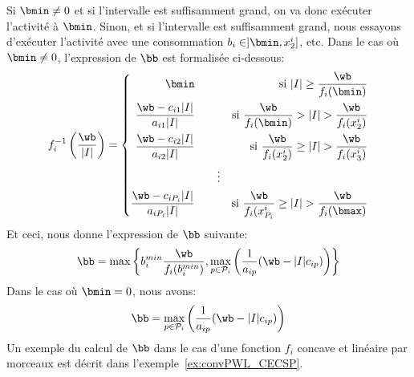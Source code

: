 Si $\bmin\neq 0$ et si l'intervalle est suffisamment grand, on va donc
exécuter l'activité à $\bmin$. Sinon, et si l'intervalle est
suffisamment grand, nous essayons d'exécuter l'activité avec une
consommation $b_i \in ]\bmin,x_2^i]$, etc. Dans le cas où $\bmin \neq
0$, l'expression de $\bb$ est formalisée ci-dessous:
\[f_i^{-1}\left(\frac{\wb}{|I|}\right)=\left\{
    \begin{aligned}
      \bmin & \qquad & \text{si } |I| \ge \frac{\wb}{f_i(\bmin)}\\
      \frac{\wb -c_{i1}|I|}{a_{i1}|I|} & \qquad & \text{si } \frac{\wb}{f_i(\bmin)}
      > |I| > \frac{\wb}{f_i(x^i_2)} \\
      \frac{\wb -c_{i2}|I|}{a_{i2}|I|} & \qquad & \text{si }  \frac{\wb}{f_i(x^i_2)}
      \ge |I| > \frac{\wb}{f_i(x^i_3)}\\
      & \qquad \vdots& \\
      \frac{\wb -c_{iP_i}|I|}{a_{iP_i}|I|} & \qquad & \text{si }  \frac{\wb}{f_i(x^i_{P_i}}
      \ge |I| > \frac{\wb}{f_i(\bmax)}\end{aligned}
  \right.
\]
Et ceci, nous donne l'expression de $\bb$ suivante:
\begin{equation}
  \bb= 
  \max \left\{b_i^{min} \frac{\wb}{f_i(b_i^{min})},
    \max_{ p \in \P_i} \left(\frac{1}{a_{ip}}(\wb-|I|c_{ip})\right)\right\}
\end{equation}
Dans le cas où $\bmin=0$, nous avons: 
\[
  \bb= 
  \max_{ p \in \P_i} \left(\frac{1}{a_{ip}}(\wb-|I|c_{ip})\right)
\]
Un exemple du calcul de $\bb$ dans le cas d'une fonction $f_i$ concave
et linéaire par morceaux est décrit dans
l'exemple~\ref{ex:convPWL_CECSP}.

